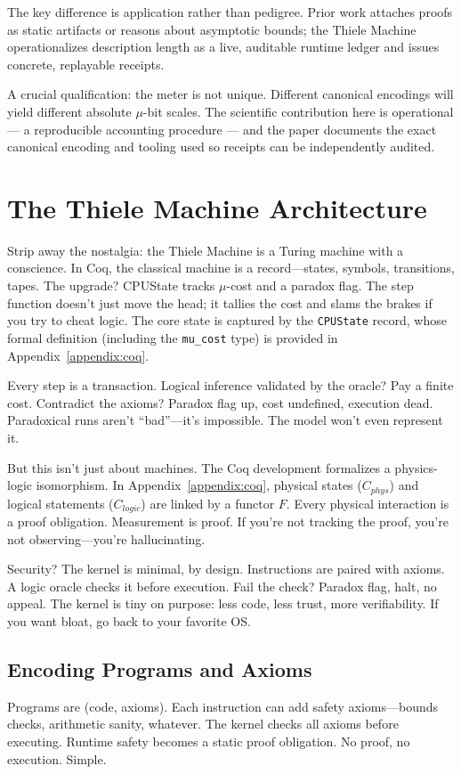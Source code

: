 \documentclass[11pt]{article}
\begin{document}
The key difference is application rather than pedigree. Prior work attaches proofs as static artifacts or reasons about asymptotic bounds; the Thiele Machine operationalizes description length as a live, auditable runtime ledger and issues concrete, replayable receipts.

A crucial qualification: the meter is not unique. Different canonical encodings will yield different absolute \(\mu\)-bit scales. The scientific contribution here is operational — a reproducible accounting procedure — and the paper documents the exact canonical encoding and tooling used so receipts can be independently audited.

\section{The Thiele Machine Architecture}
Strip away the nostalgia: the Thiele Machine is a Turing machine with a conscience. In Coq, the classical machine is a record---states, symbols, transitions, tapes. The upgrade? CPUState tracks $\mu$-cost and a paradox flag. The step function doesn’t just move the head; it tallies the cost and slams the brakes if you try to cheat logic. The core state is captured by the \texttt{CPUState} record, whose formal definition (including the \texttt{mu\_cost} type) is provided in Appendix~\ref{appendix:coq}.

Every step is a transaction. Logical inference validated by the oracle? Pay a finite cost. Contradict the axioms? Paradox flag up, cost undefined, execution dead. Paradoxical runs aren't ``bad''---it's impossible. The model won't even represent it.

But this isn’t just about machines. The Coq development formalizes a physics-logic isomorphism. In Appendix~\ref{appendix:coq}, physical states ($C_{phys}$) and logical statements ($C_{logic}$) are linked by a functor $F$. Every physical interaction is a proof obligation. Measurement is proof. If you’re not tracking the proof, you’re not observing---you’re hallucinating.

Security? The kernel is minimal, by design. Instructions are paired with axioms. A logic oracle checks it before execution. Fail the check? Paradox flag, halt, no appeal. The kernel is tiny on purpose: less code, less trust, more verifiability. If you want bloat, go back to your favorite OS.

\subsection{Encoding Programs and Axioms}
Programs are (code, axioms). Each instruction can add safety axioms---bounds checks, arithmetic sanity, whatever. The kernel checks all axioms before executing. Runtime safety becomes a static proof obligation. No proof, no execution. Simple.
\end{document}
